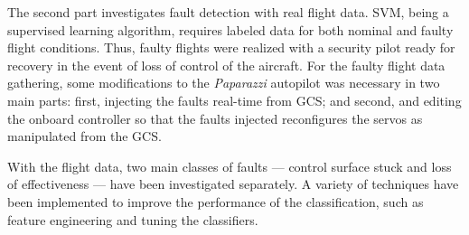 The second part investigates fault detection with real flight data. 
SVM, being a supervised learning algorithm, requires labeled data for both nominal and faulty flight conditions. 
Thus, faulty flights were realized with a security pilot ready for recovery in the event of loss of control of the aircraft.
For the faulty flight data gathering, some modifications to the \emph{Paparazzi} autopilot was necessary in two main parts: first, injecting the faults real-time from GCS; and second, and editing the onboard controller so that the faults injected reconfigures the servos as manipulated from the GCS. 

With the flight data, two main classes of faults --- control surface stuck and loss of effectiveness --- have been investigated separately. 
A variety of techniques have been implemented to improve the performance of the classification, such as feature engineering and tuning the classifiers. 
